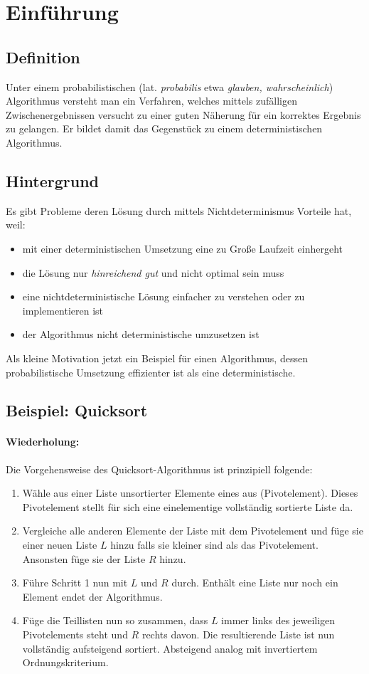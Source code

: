 \section{Einführung}


\subsection{Definition}
Unter einem probabilistischen (lat. \emph{probabilis} etwa \emph{glauben, wahrscheinlich}) Algorithmus versteht man ein Verfahren, welches mittels zufälligen Zwischenergebnissen versucht zu einer guten Näherung für ein korrektes Ergebnis zu gelangen.
Er bildet damit das Gegenstück zu einem deterministischen Algorithmus.


\subsection{Hintergrund}	
Es gibt Probleme deren Lösung durch mittels Nichtdeterminismus Vorteile hat, weil:
\begin{itemize}
	\item mit einer deterministischen Umsetzung eine zu Große Laufzeit einhergeht
	\item die Lösung nur \emph{hinreichend gut} und nicht optimal sein muss
	\item eine nichtdeterministische Lösung einfacher zu verstehen oder zu implementieren ist
	\item der Algorithmus nicht deterministische umzusetzen ist
\end{itemize}

Als kleine Motivation jetzt ein Beispiel für einen Algorithmus, dessen probabilistische Umsetzung effizienter ist als eine deterministische. 

\subsection{Beispiel: Quicksort}
\paragraph{Wiederholung:}
Die Vorgehensweise des Quicksort-Algorithmus ist prinzipiell folgende:
\begin{enumerate}
	\item Wähle aus einer Liste unsortierter Elemente eines aus (Pivotelement). Dieses Pivotelement stellt für sich eine einelementige vollständig sortierte Liste da.
	\item Vergleiche alle anderen Elemente der Liste mit dem Pivotelement und füge sie einer neuen Liste $L$ hinzu falls sie kleiner sind als das Pivotelement. Ansonsten füge sie der Liste $R$ hinzu.
	\item Führe Schritt 1 nun mit $L$ und $R$ durch. Enthält eine Liste nur noch ein Element endet der Algorithmus.
	\item Füge die Teillisten nun so zusammen, dass $L$ immer links des jeweiligen Pivotelements steht und $R$ rechts davon. Die resultierende Liste ist nun vollständig aufsteigend sortiert. Absteigend analog mit invertiertem Ordnungskriterium. 
\end{enumerate}

